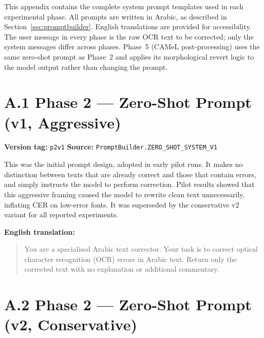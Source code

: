
This appendix contains the complete system prompt templates used in each
experimental phase. All prompts are written in Arabic, as described in
Section~\ref{sec:promptbuilder}. English translations are provided
for accessibility. The user message in every phase is the raw OCR text
to be corrected; only the system messages differ across phases.
Phase~5 (CAMeL post-processing) uses the same zero-shot prompt as Phase~2
and applies its morphological revert logic to the model output rather than
changing the prompt.

\section*{A.1 \quad Phase 2 --- Zero-Shot Prompt (v1, Aggressive)}

\textbf{Version tag:} \texttt{p2v1} \quad
\textbf{Source:} \texttt{PromptBuilder.ZERO\_SHOT\_SYSTEM\_V1}

\noindent
This was the initial prompt design, adopted in early pilot runs.
It makes no distinction between texts that are already correct and those that
contain errors, and simply instructs the model to perform correction.
Pilot results showed that this aggressive framing caused the model to rewrite
clean text unnecessarily, inflating CER on low-error fonts.
It was superseded by the conservative v2 variant for all reported experiments.

\begin{quote}\itshape
\end{quote}

\textbf{English translation:}
\begin{quote}
  You are a specialised Arabic text corrector.
  Your task is to correct optical character recognition (OCR) errors in
  Arabic text.
  Return only the corrected text with no explanation or additional commentary.
\end{quote}

\section*{A.2 \quad Phase 2 --- Zero-Shot Prompt (v2, Conservative)}


